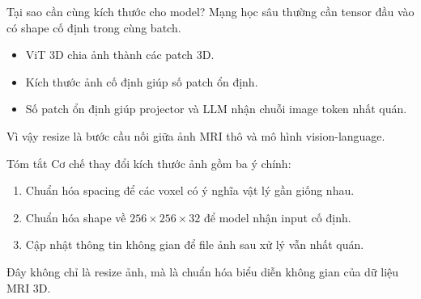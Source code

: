 \documentclass[aspectratio=169]{beamer}
\begin{document}
\begin{frame}{Tại sao cần cùng kích thước cho model?}
  Mạng học sâu thường cần tensor đầu vào có shape cố định trong cùng batch.

  \begin{itemize}
    \item ViT 3D chia ảnh thành các patch 3D.
    \item Kích thước ảnh cố định giúp số patch ổn định.
    \item Số patch ổn định giúp projector và LLM nhận chuỗi image token nhất quán.
  \end{itemize}

  \vspace{0.3cm}
  Vì vậy resize là bước cầu nối giữa ảnh MRI thô và mô hình vision-language.
\end{frame}

\begin{frame}{Tóm tắt}
  Cơ chế thay đổi kích thước ảnh gồm ba ý chính:

  \begin{enumerate}
    \item Chuẩn hóa spacing để các voxel có ý nghĩa vật lý gần giống nhau.
    \item Chuẩn hóa shape về \(256 \times 256 \times 32\) để model nhận input cố định.
    \item Cập nhật thông tin không gian để file ảnh sau xử lý vẫn nhất quán.
  \end{enumerate}

  \vspace{0.3cm}
  Đây không chỉ là resize ảnh, mà là chuẩn hóa biểu diễn không gian của dữ liệu MRI 3D.
\end{frame}
\end{document}
